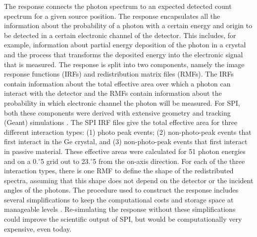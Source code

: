 \documentclass{aa}
\def\fdg{\hbox{$.\!\!^\circ$}}          %
\begin{document}
The response connects the photon spectrum to an expected detected count spectrum for a given source position. The response encapsulates all the information about the probability of a photon with a certain energy and origin to be detected in a certain electronic channel of the detector. This includes, for example, information about partial energy deposition of the photon in a crystal and the process that transforms the deposited energy into the electronic signal that is measured.
The response is split into two components, namely the image response functions (IRFs) and redistribution matrix files (RMFs). The IRFs contain information about the total effective area over which a photon can interact with the detector and the RMFs contain information about the probability in which electronic channel the photon will be measured.
For SPI, both these components were derived with extensive geometry and tracking (Geant) simulations \citep{spi_response}.
The SPI IRF files give the total effective area for three different interaction types:
 (1) photo peak events;
 (2) non-photo-peak events that first interact in the Ge crystal, and
 (3) non-photo-peak events that first interact in passive material.
These effective areas were calculated for 51 photon energies and on a 0\fdg5  grid out to 23\fdg5 from the on-axis direction. For each of the three interaction types, there is one RMF to define the shape of the redistributed spectra, assuming that this shape does not depend on the detector or the incident angles of the photons. The procedure used to construct the response includes several simplifications to keep the computational costs and storage space at manageable levels \citep{spi_response}. Re-simulating the response without these simplifications could improve the scientific output of SPI, but would be computationally very expensive, even today.
\end{document}
